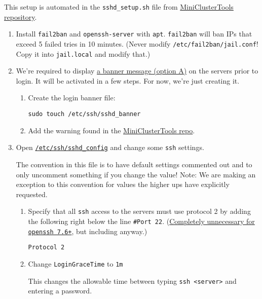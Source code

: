 This setup is automated in the \texttt{sshd\_setup.sh} file from \href{https://github.com/coyleej/MiniClusterTools}{MiniClusterTools repository}. 

\begin{enumerate}
\item Install \texttt{fail2ban} and \texttt{openssh-server} with \texttt{apt}. \texttt{fail2ban} will ban IPs that exceed 5 failed tries in 10 minutes. (Never modify \texttt{/etc/fail2ban/jail.conf}! Copy it into \texttt{jail.local} and modify that.)

\item We're required to display \href{https://www.stigviewer.com/stig/firewall/2015-09-18/finding/V-3013}{a banner message (option A)} on the servers prior to login. It will be activated in a few steps. For now, we're just creating it.

	\begin{enumerate}
		\item Create the login banner file: 

			\texttt{sudo touch /etc/ssh/sshd\_banner}

		\item Add the warning found in the \href{https://github.com/coyleej/MiniClusterTools/tree/master/files}{MiniClusterTools repo}. 
	\end{enumerate}

\item Open \href{https://linux.die.net/man/5/sshd_config}{\texttt{/etc/ssh/sshd\_config}} and change some \texttt{ssh} settings.

	The convention in this file is to have default settings commented out and to only uncomment something if you change the value! Note: We are making an exception to this convention for values the higher ups have explicitly requested.

	\begin{enumerate}
	\item Specify that all \texttt{ssh} access to the servers must use protocol 2 by adding the following right below the line \texttt{\#Port 22}. (\href{https://www.openssh.com/txt/release-7.6}{Completely unnecessary for \texttt{openssh 7.6+}}, but including anyway.)

		\texttt{Protocol 2}

	\item Change \texttt{LoginGraceTime} to \texttt{1m}

	This changes the allowable time between typing \texttt{ssh <server>} and entering a password.


\end{enumerate}
\end{enumerate}
